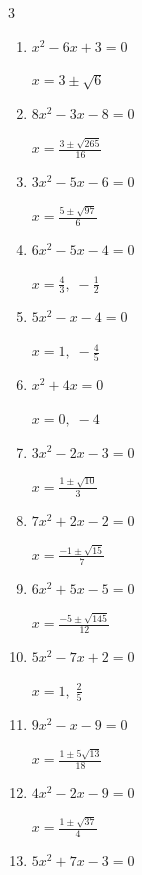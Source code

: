 \begin{multicols}{3}
\begin{enumerate}
  \item $x^{2}-6x+3=0$

        $\displaystyle x=3\pm \sqrt{6}$

  \item $8x^{2}-3x-8=0$

        $\displaystyle x=\frac{3\pm \sqrt{265}}{16}$

\columnbreak %

\resetques

  \item $3x^{2}-5x-6=0$

        $\displaystyle x=\frac{5\pm \sqrt{97}}{6}$

  \item $6x^{2}-5x-4=0$

        $\displaystyle x=\frac{4}{3}, \; -\frac{1}{2}$

  \item $5x^{2}-x-4=0$

        $\displaystyle x=1, \; -\frac{4}{5}$

  \item $x^{2}+4x=0$

        $\displaystyle x=0, \; -4$

  \item $3x^{2}-2x-3=0$

        $\displaystyle x=\frac{1\pm \sqrt{10}}{3}$

  \item $7x^{2}+2x-2=0$

        $\displaystyle x=\frac{-1\pm \sqrt{15}}{7}$

  \item $6x^{2}+5x-5=0$

        $\displaystyle x=\frac{-5\pm \sqrt{145}}{12}$

\columnbreak %

  \item $5x^{2}-7x+2=0$

        $\displaystyle x=1, \; \frac{2}{5}$

  \item $9x^{2}-x-9=0$

        $\displaystyle x=\frac{1\pm 5\sqrt{13}}{18}$

  \item $4x^{2}-2x-9=0$

        $\displaystyle x=\frac{1\pm \sqrt{37}}{4}$

  \item $5x^{2}+7x-3=0$


\end{enumerate}
\end{multicols}
